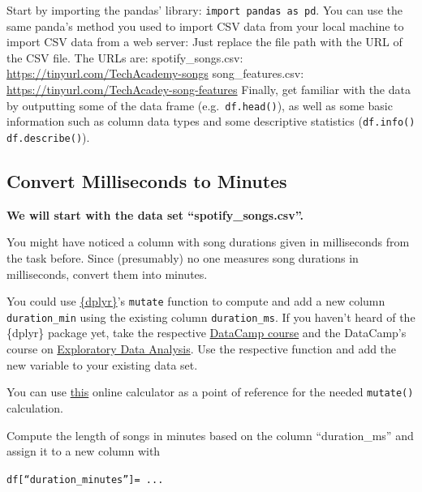 \documentclass[
  11pt,
]{book}
\newenvironment{tips}[1]
  {
  \begin{itemize}
  \footnotesize
  \renewcommand{\labelitemi}{
    \raisebox{-.7\height}[0pt][0pt]{
      {\setkeys{Gin}{width=3em,keepaspectratio}
        \texttt{[image: images/\#1.png]}}
    }
  }
  \setlength{\fboxsep}{1em}
  \begin{rbox}
  \item
  }
  {
  \end{rbox}
  \end{itemize}
  }
\newenvironment{tipsp}[1]
  {
  \begin{itemize}
  \footnotesize
  \renewcommand{\labelitemi}{
    \raisebox{-.7\height}[0pt][0pt]{
      {\setkeys{Gin}{width=3em,keepaspectratio}
        \texttt{[image: images/\#1.png]}}
    }
  }
  \setlength{\fboxsep}{1em}
  \begin{pbox}
  \item
  }
  {
  \end{pbox}
  \end{itemize}
  }
\begin{document}
\begin{tipsp}p

Start by importing the pandas' library: \texttt{import\ pandas\ as\ pd}.
You can use the same panda's method you used to import CSV data from your local machine to import CSV data from a web server: Just replace the file path with the URL of the CSV file.
The URLs are:
spotify\_songs.csv: \url{https://tinyurl.com/TechAcademy-songs}
song\_features.csv: \url{https://tinyurl.com/TechAcadey-song-features}
Finally, get familiar with the data by outputting some of the data frame (e.g.~\texttt{df.head()}), as well as some basic information such as column data types and some descriptive statistics (\texttt{df.info()} \texttt{df.describe()}).

\end{tipsp}

\hypertarget{convert-milliseconds-to-minutes}{%
\subsection{Convert Milliseconds to Minutes}\label{convert-milliseconds-to-minutes}}

\textbf{We will start with the data set ``spotify\_songs.csv''.}

You might have noticed a column with song durations given in milliseconds from the task before. Since (presumably) no one measures song durations in milliseconds, convert them into minutes.

\begin{tips}r

You could use \href{https://dplyr.tidyverse.org/index.html}{\{dplyr\}}'s \texttt{mutate} function to compute and add a new column \texttt{duration\_min} using the existing column \texttt{duration\_ms}. If you haven't heard of the \{dplyr\} package yet, take the respective \href{https://www.datacamp.com/courses/data-manipulation-with-dplyr}{DataCamp course} and the DataCamp's course on \href{https://www.datacamp.com/courses/exploratory-data-analysis}{Exploratory Data Analysis}. Use the respective function and add the new variable to your existing data set.

You can use \href{https://www.timecalculator.net/milliseconds-to-minutes}{this} online calculator as a point of reference for the needed \texttt{mutate()} calculation.

\end{tips}

\begin{tipsp}p

Compute the length of songs in minutes based on the column ``duration\_ms'' and assign it to a new column with

\texttt{df{[}“duration\_minutes”{]}=\ ...}

\end{tipsp}
\end{document}
